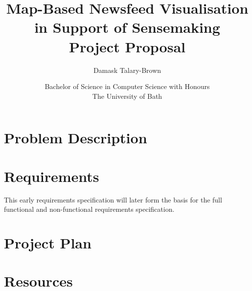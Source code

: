 \documentclass[11pt, a4paper]{report}
\title{\Huge\bfseries{Map-Based Newsfeed Visualisation in Support of Sensemaking} \\[1cm] \huge{Project Proposal}}
\author{Damask Talary-Brown}
\date{Bachelor of Science in Computer Science with Honours\\The University of Bath\\ \the\year}
\begin{document}
\lstset{language=Python, breaklines, breakatwhitespace, basicstyle=\small}


\setcounter{page}{0}
\maketitle
\newpage



\tableofcontents
\newpage


\setcounter{page}{1}


\chapter{Problem Description}


\chapter{Requirements}
This early requirements specification will later form the basis for the full functional and non-functional requirements specification.


\chapter{Project Plan}



\chapter{Resources}



%

%

%

%


\appendix
\end{document}
